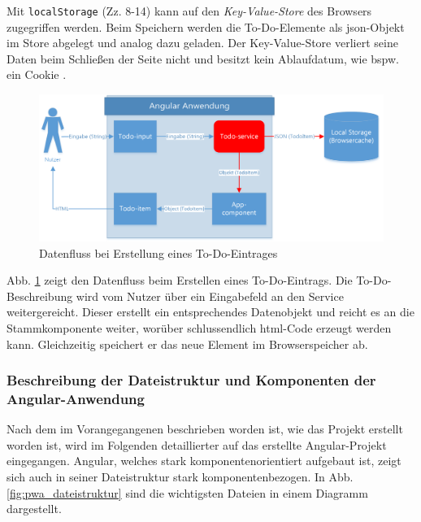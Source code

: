 Mit \texttt{localStorage} (Zz. 8-14) kann auf den \textit{Key-Value-Store} des Browsers zugegriffen werden. Beim Speichern werden die To-Do-Elemente als \ac{json}-Objekt im Store abgelegt und analog dazu geladen. Der Key-Value-Store verliert seine Daten beim Schließen der Seite nicht und besitzt kein Ablaufdatum, wie bspw. ein Cookie \cite{LocalStorage}.

\begin{figure}[h!]
	\includegraphics[width=\textwidth]{img/pwa_datenfluss_erstellen.png}
	\centering
	\caption{Datenfluss bei Erstellung eines To-Do-Eintrages}
	\label{fig:pwa_datenfluss_erstellen}
\end{figure}

Abb. \ref{fig:pwa_datenfluss_erstellen} zeigt den Datenfluss beim Erstellen eines To-Do-Eintrags. Die To-Do-Beschreibung wird vom Nutzer über ein Eingabefeld an den Service weitergereicht. Dieser erstellt ein entsprechendes Datenobjekt und reicht es an die Stammkomponente weiter, worüber schlussendlich \ac{html}-Code erzeugt werden kann. Gleichzeitig speichert er das neue Element im Browserspeicher ab.

\subsubsection{Beschreibung der Dateistruktur und Komponenten der Angular-Anwendung}
Nach dem im Vorangegangenen beschrieben worden ist, wie das Projekt erstellt worden ist, wird im Folgenden detaillierter auf das erstellte Angular-Projekt eingegangen. Angular, welches stark komponentenorientiert aufgebaut ist, zeigt sich auch in seiner Dateistruktur stark komponentenbezogen. In Abb. \ref{fig:pwa_dateistruktur} sind die wichtigsten Dateien in einem Diagramm dargestellt.

